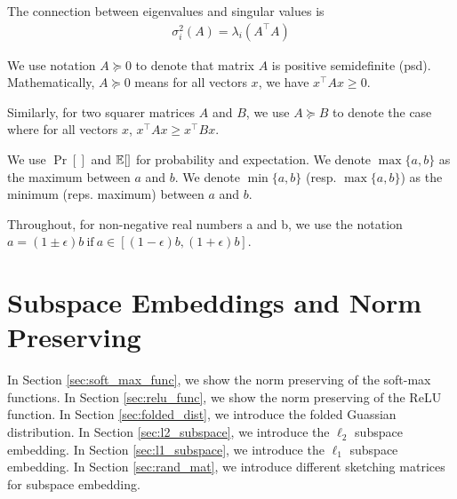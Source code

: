 The connection between eigenvalues and singular values is 
\begin{align*}
\sigma_i^2(A) = \lambda_i (A^\top A)
\end{align*}

We use notation $A \succeq 0$ to denote that matrix $A$ is positive semidefinite (psd). Mathematically, $A\succeq 0$ means for all vectors $x$, we have $x^\top A x \geq 0$.

Similarly, for two squarer matrices $A$ and $B$, we use $A \succeq B$ to denote the case where for all vectors $x$, $x^\top  Ax \geq x^\top B x$. 

We use $\Pr[]$ and $\operatorname*{{\mathbb{E}}}[]$ for probability and expectation. We denote $\max\{a,b\}$ as the maximum between $a$ and $b$. We denote $\min \{a,b\}$ (resp. $\max\{a,b\}$) as the minimum (reps. maximum) between $a$ and $b$. 

 Throughout, for non-negative real numbers
a and b, we use the notation $a = (1 \pm \epsilon)b ~\text{if}~a \in [(1 - \epsilon)b,(1 + \epsilon)b]$.

\section{Subspace Embeddings and Norm Preserving}\label{sec:subspace_embedding}
In Section \ref{sec:soft_max_func}, we show the norm preserving of the soft-max functions.
In Section \ref{sec:relu_func}, we show the norm preserving of the ReLU function.
In Section \ref{sec:folded_dist}, we introduce the folded Guassian distribution.
In Section \ref{sec:l2_subspace}, we introduce the $\ell_2$ subspace embedding.
In Section \ref{sec:l1_subspace}, we introduce the $\ell_1$ subspace embedding.
In Section \ref{sec:rand_mat}, we introduce different sketching matrices for subspace embedding.



